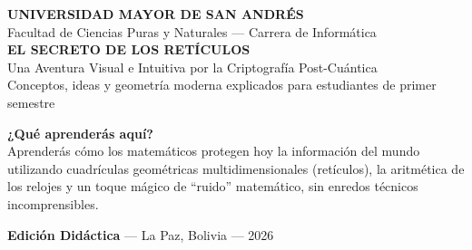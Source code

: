 \documentclass[11pt,a4paper,oneside]{book}
\begin{document}
\begin{titlepage}

\vspace*{1.5cm}
\begin{flushleft}
  \hspace*{1.8cm}
  \begin{minipage}{0.88\textwidth}
    {\large\sffamily\bfseries\color{PQCTeal} UNIVERSIDAD MAYOR DE SAN ANDRÉS}\\[0.2cm]
    {\small\sffamily\color{gray} Facultad de Ciencias Puras y Naturales --- Carrera de Informática}\\[2.5cm]
    
    {\fontsize{30}{36}\sffamily\bfseries\color{PQCMainBlue} EL SECRETO DE LOS RETÍCULOS}\\[0.6cm]
    {\LARGE\sffamily\color{PQCPurple} Una Aventura Visual e Intuitiva por la Criptografía Post-Cuántica}\\[0.4cm]
    {\large\sffamily\color{gray!90!black} Conceptos, ideas y geometría moderna explicados para estudiantes de primer semestre}\\[2.5cm]
    
    \begin{tcolorbox}[colback=white, colframe=PQCTeal, arc=2mm, width=0.95\textwidth]
      \sffamily\small
      \textbf{¿Qué aprenderás aquí?} \\
      Aprenderás cómo los matemáticos protegen hoy la información del mundo utilizando cuadrículas geométricas multidimensionales (retículos), la aritmética de los relojes y un toque mágico de ``ruido'' matemático, sin enredos técnicos incomprensibles.
    \end{tcolorbox}
    
    \vfill
    \vspace*{2cm}
    {\small\sffamily\color{gray}
    \textbf{Edición Didáctica} --- La Paz, Bolivia --- 2026}
  \end{minipage}
\end{flushleft}
\end{titlepage}
\end{document}
